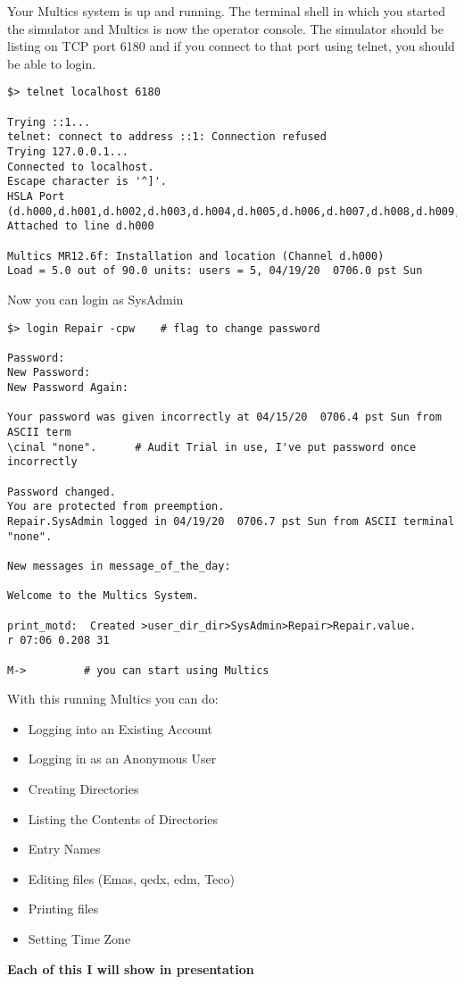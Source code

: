 Your Multics system is up and running. The terminal shell in which you started the simulator and Multics is now the operator console.
The simulator should be listing on TCP port 6180 and if you connect to that port using telnet, you should be able to login. 

\begin{lstlisting}
$> telnet localhost 6180

Trying ::1...
telnet: connect to address ::1: Connection refused
Trying 127.0.0.1...
Connected to localhost.
Escape character is '^]'.
HSLA Port (d.h000,d.h001,d.h002,d.h003,d.h004,d.h005,d.h006,d.h007,d.h008,d.h009,d.h010,d.h011,d.h012,d.h013,d.h014,d.h015,d.h016,d.h017,d.h018,d.h019,d.h020,d.h021,d.h022,d.h023,d.h024,d.h025,d.h026,d.h027,d.h028,d.h029,d.h030,d.h031)? 
Attached to line d.h000

Multics MR12.6f: Installation and location (Channel d.h000)
Load = 5.0 out of 90.0 units: users = 5, 04/19/20  0706.0 pst Sun
\end{lstlisting}

Now you can login as SysAdmin

\begin{lstlisting}
$> login Repair -cpw    # flag to change password

Password:
New Password:
New Password Again:

Your password was given incorrectly at 04/15/20  0706.4 pst Sun from ASCII term
\cinal "none".      # Audit Trial in use, I've put password once incorrectly

Password changed.
You are protected from preemption.
Repair.SysAdmin logged in 04/19/20  0706.7 pst Sun from ASCII terminal "none".

New messages in message_of_the_day:

Welcome to the Multics System.

print_motd:  Created >user_dir_dir>SysAdmin>Repair>Repair.value.
r 07:06 0.208 31

M->         # you can start using Multics
\end{lstlisting}

With this running Multics you can do:

\begin{itemize}
    \item Logging into an Existing Account
    \item Logging in as an Anonymous User
    \item Creating Directories
    \item Listing the Contents of Directories
    \item Entry Names
    \item Editing files (Emas, qedx, edm, Teco)
    \item Printing files
    \item Setting Time Zone
\end{itemize}

\textbf{Each of this I will show in presentation}



